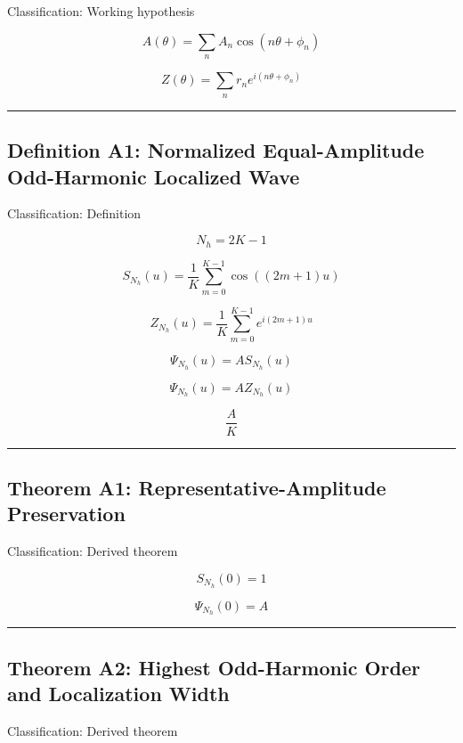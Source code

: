 \documentclass[
  a4paper,
]{article}
\begin{document}
Classification: Working hypothesis

\[
A(\theta)=\sum_n A_n\cos(n\theta+\phi_n)
\]

\[
Z(\theta)=\sum_n r_n e^{i(n\theta+\phi_n)}
\]

\begin{center}\rule{0.5\linewidth}{0.5pt}\end{center}

\subsection{Definition A1: Normalized Equal-Amplitude Odd-Harmonic
Localized
Wave}\label{definition-a1-normalized-equal-amplitude-odd-harmonic-localized-wave}

Classification: Definition

\[
N_h=2K-1
\]

\[
S_{N_h}(u)=\frac{1}{K}\sum_{m=0}^{K-1}\cos((2m+1)u)
\]

\[
Z_{N_h}(u)=\frac{1}{K}\sum_{m=0}^{K-1}e^{i(2m+1)u}
\]

\[
\Psi_{N_h}(u)=A S_{N_h}(u)
\]

\[
\Psi_{N_h}(u)=A Z_{N_h}(u)
\]

\[
\frac{A}{K}
\]

\begin{center}\rule{0.5\linewidth}{0.5pt}\end{center}

\subsection{Theorem A1: Representative-Amplitude
Preservation}\label{theorem-a1-representative-amplitude-preservation}

Classification: Derived theorem

\[
S_{N_h}(0)=1
\]

\[
\Psi_{N_h}(0)=A
\]

\begin{center}\rule{0.5\linewidth}{0.5pt}\end{center}

\subsection{Theorem A2: Highest Odd-Harmonic Order and Localization
Width}\label{theorem-a2-highest-odd-harmonic-order-and-localization-width}

Classification: Derived theorem
\end{document}

